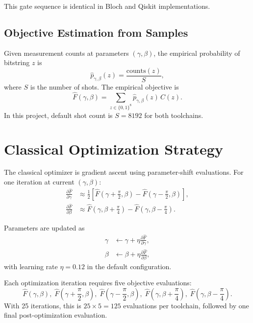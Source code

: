 This gate sequence is identical in Bloch and Qiskit implementations.

\subsection{Objective Estimation from Samples}

Given measurement counts at parameters \((\gamma,\beta)\), the empirical probability of bitstring \(z\) is
\[
\hat{p}_{\gamma,\beta}(z)=\frac{\mathrm{counts}(z)}{S},
\]
where \(S\) is the number of shots.
The empirical objective is
\[
\hat{F}(\gamma,\beta)=\sum_{z\in\{0,1\}^{8}} \hat{p}_{\gamma,\beta}(z)\, C(z).
\]
In this project, default shot count is \(S=8192\) for both toolchains.

\section{Classical Optimization Strategy}
\label{sec:classical_optimization}

The classical optimizer is gradient ascent using parameter-shift evaluations.
For one iteration at current \((\gamma,\beta)\):
\begin{align}
\frac{\partial \hat{F}}{\partial \gamma}
&\approx \frac{1}{2}\left[\hat{F}\!\left(\gamma+\frac{\pi}{2},\beta\right)-\hat{F}\!\left(\gamma-\frac{\pi}{2},\beta\right)\right], \\
\frac{\partial \hat{F}}{\partial \beta}
&\approx \hat{F}\!\left(\gamma,\beta+\frac{\pi}{4}\right)-\hat{F}\!\left(\gamma,\beta-\frac{\pi}{4}\right).
\end{align}

Parameters are updated as
\begin{align}
\gamma &\leftarrow \gamma + \eta \frac{\partial \hat{F}}{\partial \gamma}, \\
\beta  &\leftarrow \beta  + \eta \frac{\partial \hat{F}}{\partial \beta},
\end{align}
with learning rate \(\eta=0.12\) in the default configuration.

Each optimization iteration requires five objective evaluations:
\[
\hat{F}(\gamma,\beta),\;
\hat{F}\!\left(\gamma+\frac{\pi}{2},\beta\right),\;
\hat{F}\!\left(\gamma-\frac{\pi}{2},\beta\right),\;
\hat{F}\!\left(\gamma,\beta+\frac{\pi}{4}\right),\;
\hat{F}\!\left(\gamma,\beta-\frac{\pi}{4}\right).
\]
With 25 iterations, this is \(25\times 5=125\) evaluations per toolchain, followed by one final post-optimization evaluation.

